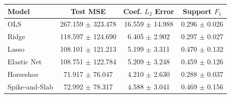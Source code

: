 \begin{tabular}{lccc}
\toprule
Model & Test MSE & Coef. $L_2$ Error & Support $F_1$ \\
\midrule
OLS & 267.159 $\pm$ 323.478 & 16.559 $\pm$ 14.988 & 0.296 $\pm$ 0.026 \\
Ridge & 118.597 $\pm$ 124.690 & 6.405 $\pm$ 2.902 & 0.297 $\pm$ 0.027 \\
Lasso & 108.101 $\pm$ 121.213 & 5.199 $\pm$ 3.311 & 0.470 $\pm$ 0.132 \\
Elastic Net & 108.751 $\pm$ 122.784 & 5.209 $\pm$ 3.248 & 0.459 $\pm$ 0.126 \\
Horseshoe & 71.917 $\pm$ 76.047 & 4.210 $\pm$ 2.630 & 0.288 $\pm$ 0.037 \\
Spike-and-Slab & 72.992 $\pm$ 78.317 & 4.588 $\pm$ 3.041 & 0.469 $\pm$ 0.156 \\
\bottomrule
\end{tabular}